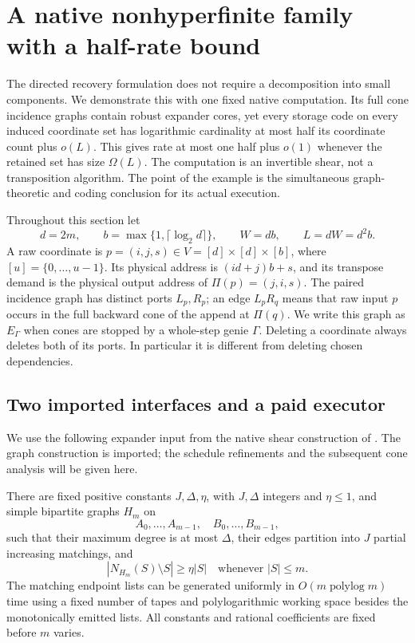 \section{A native nonhyperfinite family with a half-rate bound}
\label{sec:ne}

The directed recovery formulation does not require a decomposition into
small components.  We demonstrate this with one fixed native computation.
Its full cone incidence graphs contain robust expander cores, yet every
storage code on every induced coordinate set has logarithmic cardinality
at most half its coordinate count plus $o(L)$.  This gives rate at most
one half plus $o(1)$ whenever the retained set has size $\Omega(L)$.
The computation is an invertible shear,
not a transposition algorithm.  The point of the example is the simultaneous
graph-theoretic and coding conclusion for its actual execution.

Throughout this section let
\[
 d=2m,\qquad b=\max\{1,\lceil\log_2d\rceil\},\qquad
 W=db,\qquad L=dW=d^2b.
\]
A raw coordinate is $p=(i,j,s)\in V=[d]\times[d]\times[b]$, where
$[u]=\{0,\ldots,u-1\}$.  Its physical address is $(id+j)b+s$, and its
transpose demand is the physical output address of
$\Pi(p)=(j,i,s)$.  The paired incidence graph has distinct ports $L_p,R_p$;
an edge $L_pR_q$ means that raw input $p$ occurs in the full backward cone
of the append at $\Pi(q)$.  We write this graph as $E_\Gamma$ when cones
are stopped by a whole-step genie $\Gamma$.  Deleting a coordinate always
deletes both of its ports.  In particular it is different from deleting
chosen dependencies.

\subsection{Two imported interfaces and a paid executor}

We use the following expander input from the native shear construction of
\cite[section on expander shears and local recovery]{BrendeLocalCoding}.
The graph construction is imported; the schedule refinements and the
subsequent cone analysis will be given here.

\begin{lemma}\label{lem:ne-expander-import}
There are fixed positive constants $J,\Delta,\eta$, with $J,\Delta$
integers and $\eta\le1$, and simple bipartite graphs $H_m$ on
\[
 A_0,\ldots,A_{m-1},\quad B_0,\ldots,B_{m-1},
\]
such that their maximum degree is at most $\Delta$, their edges partition
into $J$ partial increasing matchings, and
\[
 |N_{H_m}(S)\setminus S|\ge\eta|S|
 \quad\text{whenever }|S|\le m.
\]
The matching endpoint lists can be generated uniformly in
$O(m\operatorname{polylog}m)$ time using a fixed number of tapes and
polylogarithmic working space besides the monotonically emitted lists.
All constants and rational coefficients are fixed before $m$ varies.
\end{lemma}

